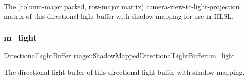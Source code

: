 The (column-\/major packed, row-\/major matrix) camera-\/view-\/to-\/light-\/projection matrix of this directional light buffer with shadow mapping for use in H\+L\+SL. \hypertarget{structmage_1_1_shadow_mapped_directional_light_buffer_a25d48ff3cbe28c78faa443000ba50e43}{}\label{structmage_1_1_shadow_mapped_directional_light_buffer_a25d48ff3cbe28c78faa443000ba50e43} 
\subsubsection{\texorpdfstring{m\+\_\+light}{m\_light}}
{\footnotesize\ttfamily \hyperlink{structmage_1_1_directional_light_buffer}{Directional\+Light\+Buffer} mage\+::\+Shadow\+Mapped\+Directional\+Light\+Buffer\+::m\+\_\+light}

The directional light buffer of this directional light buffer with shadow mapping. 